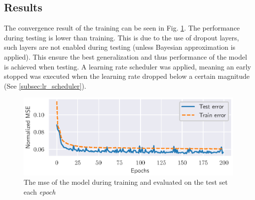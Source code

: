 

\subsection{Results}
The convergence result of the training can be seen in Fig. \ref{fig:training_test_error_channel_estimator}. The performance during testing is lower than training. This is due to the use of dropout layers, such layers are not enabled during testing (unless Bayesian approximation is applied). This ensure the best generalization and thus performance of the model is achieved when testing. A learning rate scheduler was applied, meaning an early stopped was executed when the learning rate dropped below a certain magnitude (See \ref{subsec:lr_scheduler}).
\begin{figure}
    \centering
    \includegraphics{chapters/part_uplink/figures/results/channel_estimation/Training_test_error.eps}
    \caption{The \gls{mse} of the model during training and evaluated on the test set each \emph{epoch}}
    \label{fig:training_test_error_channel_estimator}
\end{figure}

